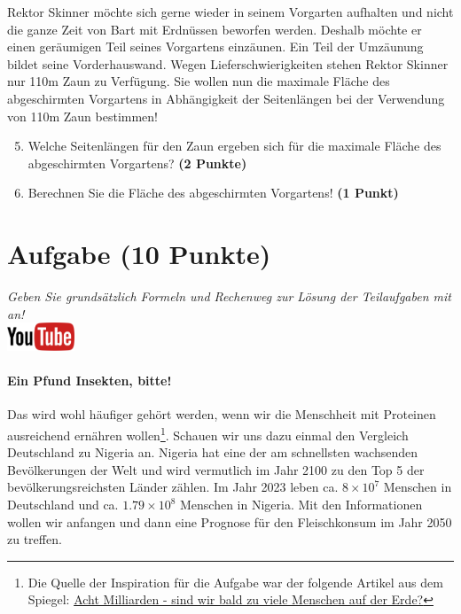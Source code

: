 \documentclass[a4paper, 9pt]{scrartcl}\usepackage[]{graphicx}\usepackage[]{xcolor}
\begin{document}
Rektor Skinner m{\"o}chte sich gerne wieder in seinem Vorgarten aufhalten und
nicht die ganze Zeit von Bart mit Erdn{\"u}ssen beworfen werden. Deshalb m{\"o}chte
er einen ger{\"a}umigen Teil seines Vorgartens einz{\"a}unen. Ein Teil der
Umz{\"a}unung bildet seine Vorderhauswand. Wegen Lieferschwierigkeiten stehen
Rektor Skinner nur 110m Zaun zu Verf{\"u}gung. Sie wollen nun die
maximale Fl{\"a}che des abgeschirmten Vorgartens in Abh{\"a}ngigkeit der
Seitenl{\"a}ngen bei der Verwendung von 110m Zaun bestimmen!

\begin{enumerate}
  \setcounter{enumi}{4}  
\item  Welche Seitenl{\"a}ngen f{\"u}r den Zaun ergeben sich f{\"u}r die
  maximale Fl{\"a}che des abgeschirmten Vorgartens? \textbf{(2 Punkte)}
\item Berechnen Sie die Fl{\"a}che des abgeschirmten Vorgartens! \textbf{(1
    Punkt)}
\end{enumerate}

 
\clearpage

\section{Aufgabe \hfill (10 Punkte)}

\textit{Geben Sie grunds{\"a}tzlich Formeln und Rechenweg zur L{\"o}sung der
  Teilaufgaben mit an!} \\[1Ex]

\hfill\href{https://youtu.be/OhyuH6hzEhY}{\includegraphics[width = 2cm]{img/youtube}} %
\hspace{2Ex}




\paragraph{Ein Pfund Insekten, bitte!} Das wird wohl h{\"a}ufiger geh{\"o}rt
werden, wenn wir die Menschheit mit Proteinen ausreichend ern{\"a}hren
wollen\footnote{Die Quelle der Inspiration f{\"u}r die Aufgabe war der folgende
  Artikel aus dem Spiegel:
  \href{https://www.spiegel.de/ausland/ueberbevoelkerung-acht-milliarden-sind-wir-bald-zu-viele-menschen-auf-der-erde-a-3f20c7bc-3d60-4440-9f52-eb338db207f5}{Acht
    Milliarden - sind wir bald zu viele Menschen auf der Erde?}}. Schauen
wir uns dazu einmal den Vergleich Deutschland zu Nigeria an. Nigeria hat
eine der am schnellsten wachsenden Bev{\"o}lkerungen der Welt und wird
vermutlich im Jahr 2100 zu den Top 5 der bev{\"o}lkerungsreichsten L{\"a}nder
z{\"a}hlen. Im Jahr 2023 leben ca. \ensuremath{8\times 10^{7}} Menschen in
Deutschland und ca. \ensuremath{1.79\times 10^{8}} Menschen in Nigeria. Mit den
Informationen wollen wir anfangen und dann eine Prognose f{\"u}r den
Fleischkonsum im Jahr 2050 zu treffen. \\ 
\end{document}
